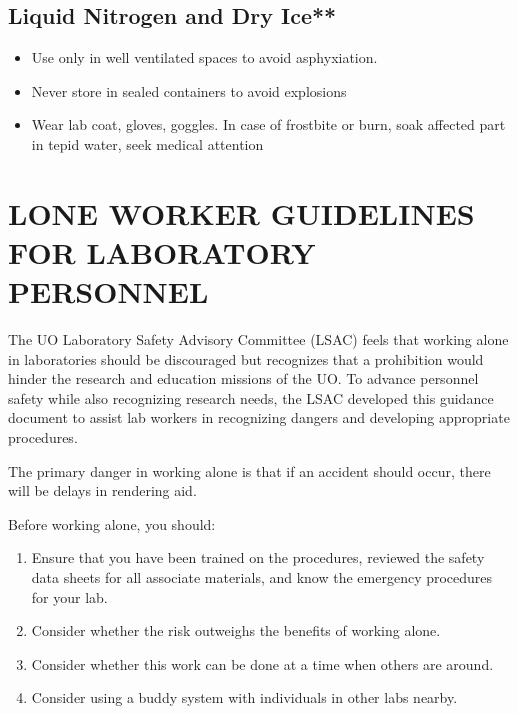 \documentclass[
]{book}
\providecommand{\tightlist}{%
  \setlength{\itemsep}{0pt}\setlength{\parskip}{0pt}}
\begin{document}
\hypertarget{liquid-nitrogen-and-dry-ice}{%
\section{Liquid Nitrogen and Dry Ice**}\label{liquid-nitrogen-and-dry-ice}}

\begin{itemize}
\item
  Use only in well ventilated spaces to avoid asphyxiation.
\item
  Never store in sealed containers to avoid explosions
\item
  Wear lab coat, gloves, goggles. In case of frostbite or burn, soak affected part in tepid water, seek medical attention
\end{itemize}

\hypertarget{lone-worker-guidelines-for-laboratory-personnel}{%
\chapter{LONE WORKER GUIDELINES FOR LABORATORY PERSONNEL}\label{lone-worker-guidelines-for-laboratory-personnel}}

The UO Laboratory Safety Advisory Committee (LSAC) feels that working alone in laboratories should be discouraged but recognizes that a prohibition would hinder the research and education missions of the UO. To advance personnel safety while also recognizing research needs, the LSAC developed this guidance document to assist lab workers in recognizing dangers and developing appropriate procedures.

The primary danger in working alone is that if an accident should occur, there will be delays in rendering aid.

Before working alone, you should:

\begin{enumerate}
\def\labelenumi{\arabic{enumi}.}
\tightlist
\item
  Ensure that you have been trained on the procedures, reviewed the safety data sheets for all associate materials, and know the emergency procedures for your lab.
\item
  Consider whether the risk outweighs the benefits of working alone.
\item
  Consider whether this work can be done at a time when others are around.
\item
  Consider using a buddy system with individuals in other labs nearby.
\end{enumerate}
\end{document}
